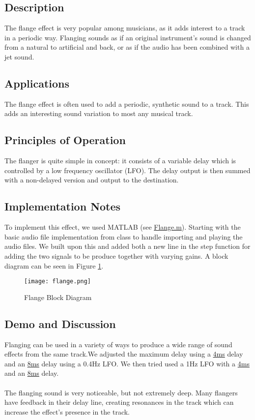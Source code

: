 \subsection{Description}
The flange effect is very popular among musicians, as it adds interest to a track in a periodic way. Flanging sounds as if an original instrument's sound is changed from a natural to artificial and back, or as if the audio has been combined with a jet sound.

\subsection{Applications}
The flange effect is often used to add a periodic, synthetic sound to a track. This adds an interesting sound variation to most any musical track.

\subsection{Principles of Operation}
The flanger is quite simple in concept: it consists of a variable delay which is controlled by a low frequency oscillator (LFO). The delay output is then summed with a non-delayed version and output to the destination.

\subsection{Implementation Notes}
To implement this effect, we used MATLAB (see \href{run:../Flange.m}{Flange.m}). Starting with the basic audio file implementation from class to handle importing and playing the audio files. We built upon this and added both a new line in the step function for adding the two signals to be produce together with varying gains. A block diagram can be seen in Figure \ref{fig:flange-block-diagram}.
\begin{figure}[ht]
	\centering
	\texttt{[image: flange.png]}
	\caption{Flange Block Diagram}
	\label{fig:flange-block-diagram}
\end{figure}

\subsection{Demo and Discussion}
Flanging can be used in a variety of ways to produce a wide range of sound effects from the same track.We adjusted the maximum delay using a
\href{run:../OutputAudio/flange_22-004 Original Guitar_{freq=0.4Hz}{delay_max=4ms}.wav}{4ms}
delay and an
\href{run:../OutputAudio/flange_22-004 Original Guitar_{freq=0.4Hz}{delay_max=8ms}.wav}{8ms}
 delay using a 0.4Hz LFO. We then tried used a 1Hz LFO with a
\href{run:../OutputAudio/flange_22-004 Original Guitar_{freq=1Hz}{delay_max=4ms}.wav}{4ms}
and an
\href{run:../OutputAudio/flange_22-004 Original Guitar_{freq=1Hz}{delay_max=8ms}.wav}{8ms}
delay.
\\ \\
The flanging sound is very noticeable, but not extremely deep. Many flangers have feedback in their delay line, creating resonances in the track which can increase the effect's presence in the track.

